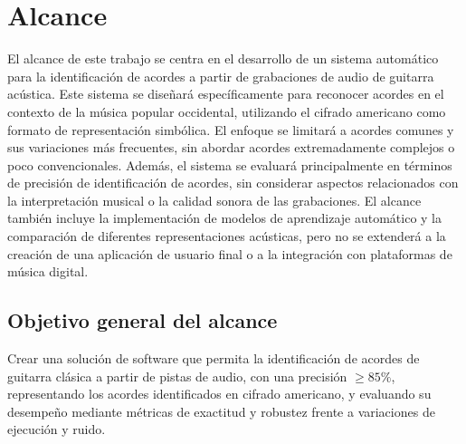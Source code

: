 \section{Alcance}
El alcance de este trabajo se centra en el desarrollo de un sistema automático para la identificación de acordes a partir de grabaciones de audio de guitarra acústica. Este sistema se diseñará específicamente para reconocer acordes en el contexto de la música popular occidental, utilizando el cifrado americano como formato de representación simbólica. El enfoque se limitará a acordes comunes y sus variaciones más frecuentes, sin abordar acordes extremadamente complejos o poco convencionales. Además, el sistema se evaluará principalmente en términos de precisión de identificación de acordes, sin considerar aspectos relacionados con la interpretación musical o la calidad sonora de las grabaciones. El alcance también incluye la implementación de modelos de aprendizaje automático y la comparación de diferentes representaciones acústicas, pero no se extenderá a la creación de una aplicación de usuario final o a la integración con plataformas de música digital.

\subsection{Objetivo general del alcance}
Crear una solución de software que permita la identificación de acordes de guitarra clásica a partir de pistas de audio, con una precisión $\geq 85\%$, representando los acordes identificados en cifrado americano, y evaluando su desempeño mediante métricas de exactitud y robustez frente a variaciones de ejecución y ruido.

